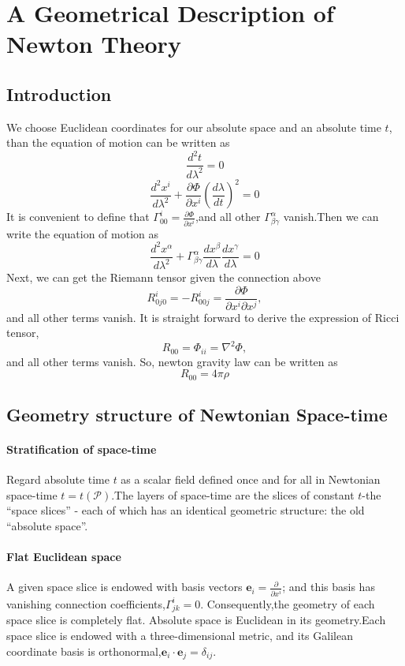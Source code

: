 \chapter{A Geometrical Description of Newton Theory}
\section{Introduction}
\noindent
We choose Euclidean coordinates for our absolute space and an absolute time $t$, than the equation of motion can be written as
\[\frac{d^2 t}{d\lambda^2} = 0\]
\[\frac{d^2 x^i}{d\lambda^2} + \frac{\partial \Phi}{\partial x^i} (\frac{d\lambda}{dt})^2=0\]
It is convenient to define that $\Gamma^i_{00} = \frac{\partial \Phi}{\partial x^i}$,and all other $\Gamma^{\alpha}_{\beta \gamma}$ vanish.Then we can write the equation of motion as
\[\frac{d^2 x^{\alpha}}{d\lambda^2} + \Gamma^{\alpha}_{\beta \gamma} \frac{dx^{\beta}}{d \lambda} \frac{dx^{\gamma}}{d \lambda}=0\]
Next, we can get the Riemann tensor given the connection above\[
R^i_{0j0} = -R^i_{00j} = \frac{\partial \Phi}{\partial x^i \partial x^j},
\]and all other terms vanish. It is straight forward to derive the expression of Ricci tensor,
\[R_{00} = \Phi_{ii} = \nabla^2\Phi,\]and all other terms vanish.
So, newton gravity law can be written as
\[R_{00} = 4\pi\rho\]

\section{Geometry structure of Newtonian Space-time}
\subsubsection{Stratification of space-time}
Regard absolute time $t$ as a scalar field defined once and for all in Newtonian space-time $t=t(\mathcal{P})$.The layers of space-time are the slices of constant $t$-the ``space slices'' - each of which has an identical geometric structure: the old ``absolute space''.

\subsubsection{Flat Euclidean space}
A given space slice is endowed with basis vectors $\bm{e}_i = \frac{\partial}{\partial x^i}$; and this basis has vanishing connection coefficients,$\Gamma^i_{jk} = 0$. Consequently,the geometry of each space slice is completely flat. Absolute space is Euclidean in its geometry.Each space slice is endowed with a three-dimensional metric, and its Galilean coordinate basis is orthonormal,$\bm{e}_i \cdot \bm{e}_j = \delta_{ij}$.

